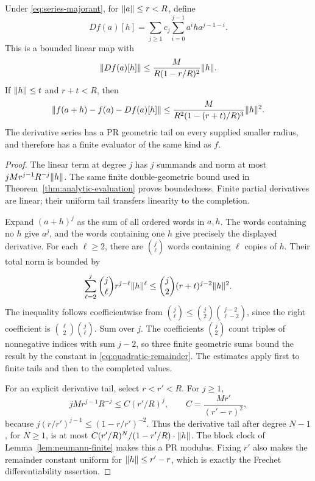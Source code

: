 \begin{theorem}\label{thm:noncomm-derivative}
Under \eqref{eq:series-majorant}, for $\lVert a\rVert\le r<R$, define
\[
 Df(a)[h]=\sum_{j\ge1}c_j
                  \sum_{i=0}^{j-1}a^iha^{j-1-i}.
\]
This is a bounded linear map with
\[
 \lVert Df(a)[h]\rVert\le\frac{M}{R(1-r/R)^2}\lVert h\rVert.
\]
If $\lVert h\rVert\le t$ and $r+t<R$, then
\begin{equation}\label{eq:quadratic-remainder}
 \lVert f(a+h)-f(a)-Df(a)[h]\rVert
 \le\frac{M}{R^2(1-(r+t)/R)^3}\lVert h\rVert^2.
\end{equation}
The derivative series has a PR geometric tail on every supplied smaller radius, and therefore has a finite evaluator of the same kind as $f$.
\end{theorem}
\begin{proof}
The linear term at degree $j$ has $j$ summands and norm at most $jMr^{j-1}R^{-j}\lVert h\rVert$. The same finite double-geometric bound used in Theorem~\ref{thm:analytic-evaluation} proves boundedness. Finite partial derivatives are linear; their uniform tail transfers linearity to the completion.

Expand $(a+h)^j$ as the sum of all ordered words in $a,h$. The words containing no $h$ give $a^j$, and the words containing one $h$ give precisely the displayed derivative. For each $\ell\ge2$, there are $\binom j\ell$ words containing $\ell$ copies of $h$. Their total norm is bounded by
\[
 \sum_{\ell=2}^j\binom j\ell r^{j-\ell}\lVert h\rVert^\ell
 \le\binom j2(r+t)^{j-2}\lVert h\rVert^2.
\]
The inequality follows coefficientwise from
$\binom j\ell\le\binom j2\binom{j-2}{\ell-2}$, since the right coefficient is $\binom\ell2\binom j\ell$. Sum over $j$. The coefficients $\binom j2$ count triples of nonnegative indices with sum $j-2$, so three finite geometric sums bound the result by the constant in \eqref{eq:quadratic-remainder}. The estimates apply first to finite tails and then to the completed values.

For an explicit derivative tail, select $r<r'<R$. For $j\ge1$,
\[
 jMr^{j-1}R^{-j}
 \le C(r'/R)^j,\qquad
 C=\frac{Mr'}{(r'-r)^2},
\]
because $j(r/r')^{j-1}\le(1-r/r')^{-2}$. Thus the derivative tail after degree $N-1$, for $N\ge1$, is at most
$C(r'/R)^N/(1-r'/R)\cdot\lVert h\rVert$.
The block clock of Lemma~\ref{lem:neumann-finite} makes this a PR modulus. Fixing $r'$ also makes the remainder constant uniform for $\lVert h\rVert\le r'-r$, which is exactly the Frechet differentiability assertion.
\end{proof}

